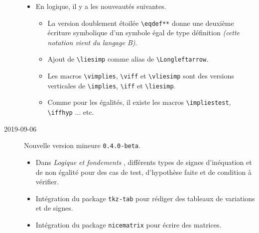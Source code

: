 \documentclass[12pt,a4paper]{article}
\newcommand\env[1]{\texttt{#1}}
\newcommand\macro[1]{\env{\textbackslash{}#1}}
\theoremstyle{definition}
\begin{document}
\begin{description}
\begin{itemize}[itemsep=.5em]
    
    
    
        \item En logique, il y a les nouveautés suivantes.
        \begin{itemize}[itemsep=.5em]
            \item La version doublement étoilée \macro{eqdef**} donne une deuxième écriture symbolique d'un symbole égal de type définition \emph{(cette notation vient du langage B)}.
    
            \item Ajout de \macro{liesimp} comme alias de \macro{Longleftarrow}.
    
            \item Les macros \macro{vimplies}, \macro{viff} et \macro{vliesimp} sont des versions verticales de \macro{implies}, \macro{iff} et \macro{liesimp}.
    
            \item Comme pour les égalités, il existe les macros \macro{impliestest}, \macro{iffhyp} ... etc.
        \end{itemize}
    \end{itemize}


    \medskip
    \item[2019-09-06] Nouvelle version mineure \verb+0.4.0-beta+.
    
    \begin{itemize}[itemsep=.5em]
        \item Dans \emph{\og Logique et fondements \fg}, différents types de signes d'inéquation et de non égalité pour des cas de test, d'hypothèse faite et de condition à vérifier.
    
    
    
    
        \item Intégration du package \verb+tkz-tab+ pour rédiger des tableaux de variations et de signes.
    
    
    
    
        \item Intégration du package \verb+nicematrix+ pour écrire des matrices.
    \end{itemize}


\end{description}
\end{document}
